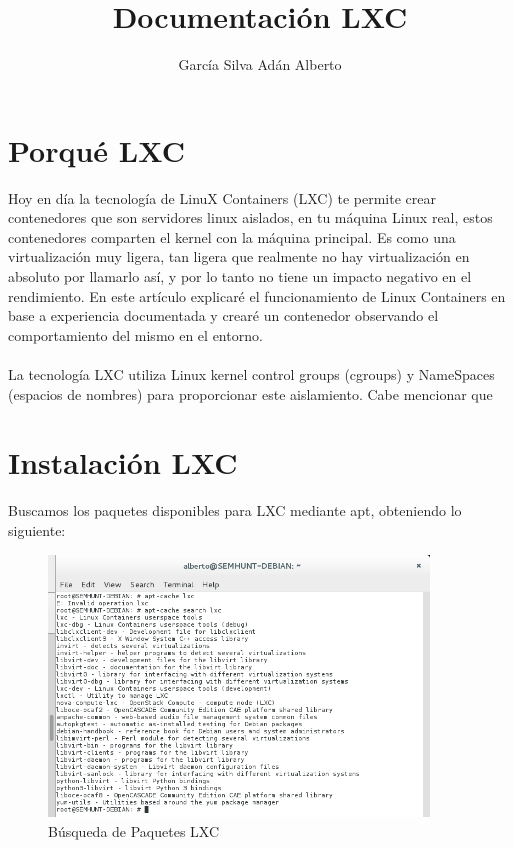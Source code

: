 \documentclass[1pt]{article} %
\title{Documentación LXC}
\author{García Silva Adán Alberto}
\begin{document}
\maketitle

\section{Porqué LXC}

Hoy en día la tecnología de LinuX Containers (LXC) te permite crear contenedores que son servidores linux aislados, en tu máquina Linux real, estos contenedores comparten el kernel con la máquina principal. Es como una virtualización muy ligera, tan ligera que realmente no hay virtualización en absoluto por llamarlo así, y por lo tanto no tiene un impacto negativo en el rendimiento. En este artículo explicaré el funcionamiento de Linux Containers en base a experiencia documentada y crearé un contenedor observando el comportamiento del mismo en el entorno.
\\
\\
La tecnología LXC utiliza Linux kernel control groups (cgroups) y NameSpaces (espacios de nombres) para proporcionar este aislamiento. Cabe mencionar que 

\section{Instalación LXC}

Buscamos los paquetes disponibles para LXC mediante apt, obteniendo lo siguiente:
\begin{center}
\end{center}
\begin{figure}[!ht]
	\begin{center}
		\includegraphics[width=0.9\textwidth]{1.png}
		\caption{Búsqueda de Paquetes LXC}
	\end{center}
\end{figure}
\end{document}
